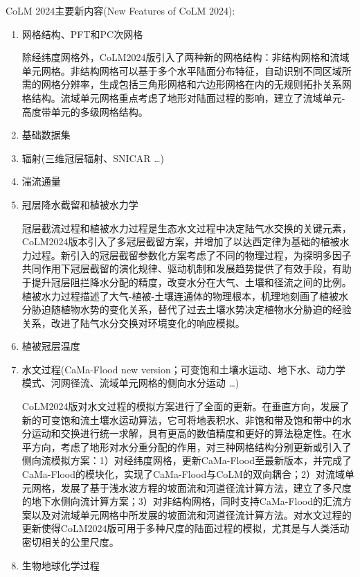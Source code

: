 CoLM 2024主要新内容(New Features of CoLM 2024):
\begin{enumerate}[label={\arabic*)}]
    \item 网格结构、PFT和PC次网格

    除经纬度网格外，CoLM2024版引入了两种新的网格结构：非结构网格和流域单元网格。非结构网格可以基于多个水平陆面分布特征，自动识别不同区域所需的网格分辨率，生成包括三角形网格和六边形网格在内的无规则拓扑关系网格结构。流域单元网格重点考虑了地形对陆面过程的影响，建立了流域单元-高度带单元的多级网格结构。
    
    \item 基础数据集
    \item 辐射(三维冠层辐射、SNICAR …)
    \item 湍流通量
    \item 冠层降水截留和植被水力学

    冠层截流过程和植被水力过程是生态水文过程中决定陆气水交换的关键元素，CoLM2024版本引入了多冠层截留方案，并增加了以达西定律为基础的植被水力过程。新引入的冠层截留参数化方案考虑了不同的物理过程，为探明多因子共同作用下冠层截留的演化规律、驱动机制和发展趋势提供了有效手段，有助于提升冠层阻拦降水分配的精度，改变水分在大气、土壤和径流之间的比例。植被水力过程描述了大气-植被-土壤连通体的物理根本，机理地刻画了植被水分胁迫随植物水势的变化关系，替代了过去土壤水势决定植物水分胁迫的经验关系，改进了陆气水分交换对环境变化的响应模拟。

    \item 植被冠层温度
    
    \item 水文过程(CaMa-Flood new version；可变饱和土壤水运动、地下水、动力学模式、河网径流、流域单元网格的侧向水分运动 …)

    CoLM2024版对水文过程的模拟方案进行了全面的更新。在垂直方向，发展了新的可变饱和流土壤水运动算法，它可将地表积水、非饱和带及饱和带中的水分运动和交换进行统一求解，具有更高的数值精度和更好的算法稳定性。在水平方向，考虑了地形对水分重分配的作用，对三种网格结构分别更新或引入了侧向流模拟方案：1）对经纬度网格，更新CaMa-Flood至最新版本，并完成了CaMa-Flood的模块化，实现了CaMa-Flood与CoLM的双向耦合；2）对流域单元网格，发展了基于浅水波方程的坡面流和河道径流计算方法，建立了多尺度的地下水侧向流计算方案；3）对非结构网格，同时支持CaMa-Flood的汇流方案以及对流域单元网格中所发展的坡面流和河道径流计算方法。对水文过程的更新使得CoLM2024版可用于多种尺度的陆面过程的模拟，尤其是与人类活动密切相关的公里尺度。
    
    \item 生物地球化学过程


\end{enumerate}
